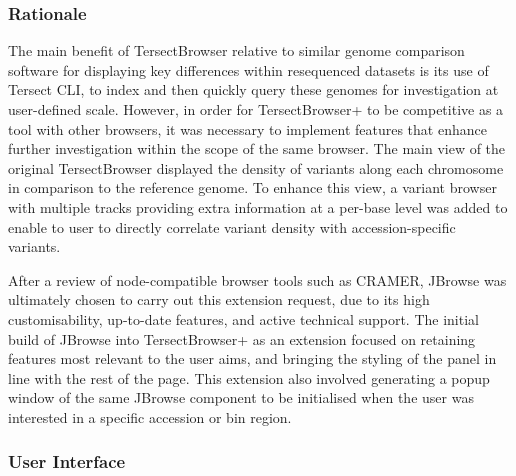\documentclass[12pt]{article}
\begin{document}
\subsubsection{Rationale}
The main benefit of TersectBrowser relative to similar genome comparison software for displaying key differences within resequenced datasets is its use of Tersect CLI, to index and then quickly query these genomes for investigation at user-defined scale. However, in order for TersectBrowser+ to be competitive as a tool with other browsers, it was necessary to implement features that enhance further investigation within the scope of the same browser. The main view of the original TersectBrowser displayed the density of variants along each chromosome in comparison to the reference genome. To enhance this view, a variant browser with multiple tracks providing extra information at a per-base level was added to enable to user to directly correlate variant density with accession-specific variants. 

After a review of node-compatible browser tools such as CRAMER, JBrowse was ultimately chosen to carry out this extension request, due to its high customisability, up-to-date features, and active technical support. The initial build of JBrowse into TersectBrowser+ as an extension focused on retaining features most relevant to the user aims, and bringing the styling of the panel in line with the rest of the page. This extension also involved generating a popup window of the same JBrowse component to be initialised when the user was interested in a specific accession or bin region. 

\subsubsection{User Interface}
\end{document}
